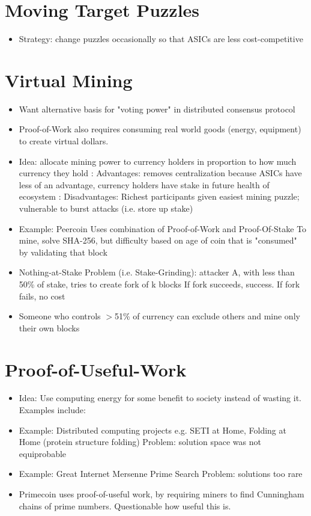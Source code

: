 \documentclass{article}
\begin{document}
\section{Moving Target Puzzles}
\begin{itemize}
\item Strategy: change puzzles occasionally so that ASICs are less cost-competitive
\end{itemize}

\section{Virtual Mining}
\begin{itemize}
\item Want alternative basis for "voting power" in distributed consensus protocol
\item Proof-of-Work also requires consuming real world goods (energy, equipment) to create virtual dollars.
\item Idea: allocate mining power to currency holders in proportion to how much currency they hold
\subitem: Advantages: removes centralization because ASICs have less of an advantage, currency holders have stake in future health of ecosystem
\subitem: Disadvantages: Richest participants given easiest mining puzzle; vulnerable to burst attacks (i.e. store up stake)
\item Example: Peercoin
\subitem Uses combination of Proof-of-Work and Proof-Of-Stake
\subitem To mine, solve SHA-256, but difficulty based on age of coin that is "consumed" by validating that block
\item Nothing-at-Stake Problem (i.e. Stake-Grinding): attacker A, with less than 50\% of stake, tries to create fork of k blocks
\subitem If fork succeeds, success. If fork fails, no cost
\item Someone who controls $>$51\% of currency can exclude others and mine only their own blocks
\end{itemize}

\section{Proof-of-Useful-Work}
\begin{itemize}
\item Idea: Use computing energy for some benefit to society instead of wasting it. Examples include:
\item Example: Distributed computing projects e.g. SETI at Home, Folding at Home (protein structure folding)
\subitem Problem: solution space was not equiprobable
\item Example: Great Internet Mersenne Prime Search
\subitem Problem: solutions too rare
\item Primecoin uses proof-of-useful work, by requiring miners to find Cunningham chains of prime numbers. Questionable how useful this is.
\end{itemize}
\end{document}
